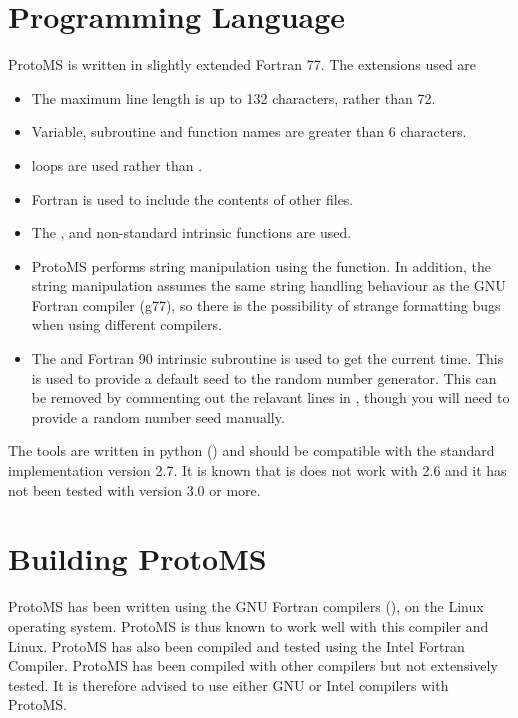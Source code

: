 \documentclass[letterpaper,10pt,english]{sphinxmanual}
\begin{document}
\section{Programming Language}
\label{\detokenize{compilation:programming-language}}\label{\detokenize{compilation:fortran77}}
ProtoMS is written in slightly extended Fortran 77. The extensions used are
\begin{itemize}
\item {} 
The maximum line length is up to 132 characters, rather than 72.

\item {} 
Variable, subroutine and function names are greater than 6 characters.

\item {} 
 loops are used rather than .

\item {} 
Fortran  is used to include the contents of other files.

\item {} 
The ,  and  non-standard intrinsic functions are used.

\item {} 
ProtoMS performs string manipulation using the  function. In addition, the string manipulation assumes the same string handling behaviour as the GNU Fortran compiler (g77), so there is the possibility of strange formatting bugs when using different compilers.

\item {} 
The  and  Fortran 90 intrinsic subroutine is used to get the current time. This is used to provide a default seed to the random number generator. This can be removed by commenting out the relavant lines in , though you will need to provide a random number seed manually.

\end{itemize}

The tools are written in python () and should be compatible with the standard implementation version 2.7. It is known that is does not work with 2.6 and it has not been tested with version 3.0 or more.


\section{Building ProtoMS}
\label{\detokenize{compilation:building-protoms}}
ProtoMS has been written using the GNU Fortran compilers (), on the Linux operating system. ProtoMS is thus known to work well with this compiler and Linux. ProtoMS has also been compiled and tested using the Intel Fortran Compiler. ProtoMS has been compiled with other compilers but not extensively tested. It is therefore advised to use either GNU or Intel compilers with ProtoMS.
\end{document}
